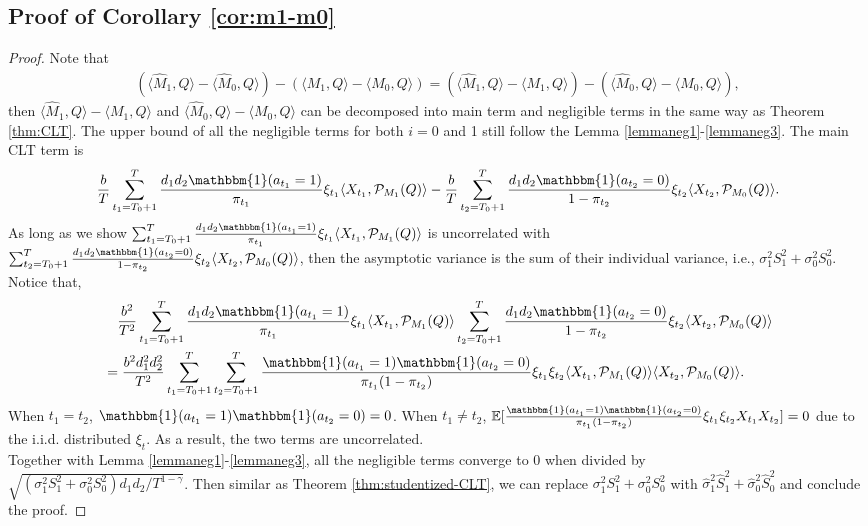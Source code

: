 \documentclass[12pt]{article}
\newcommand{\inp}[2]{\langle #1,#2\rangle}
\def\EE{{\mathbb E}}
\theoremstyle{plain}
\begin{document}
\subsection{Proof of Corollary \ref{cor:m1-m0}}
\begin{proof}
    Note that
    \begin{align*}
        (\inp{\widehat{M}_1}{Q} - \inp{\widehat{M}_0}{Q}) - (\inp{M_1}{Q} - \inp{M_0}{Q})= (\inp{\widehat{M}_1}{Q} - \inp{M_1}{Q}) - (\inp{\widehat{M}_0}{Q} - \inp{M_0}{Q}),
    \end{align*}
    then $\inp{\widehat{M}_1}{Q} - \inp{M_1}{Q}$ and $\inp{\widehat{M}_0}{Q} - \inp{M_0}{Q}$ can be decomposed into main term and negligible terms in the same way as Theorem \ref{thm:CLT}. The upper bound of all the negligible terms for both $i=0$ and 1 still follow the Lemma \ref{lemmaneg1}-\ref{lemmaneg3}. The main CLT term is
    \begin{align*}
        \frac{b}{T}\sum_{t_1=T_0+1}^{T}\frac{d_1d_2\mathbbm{1}(a_{t_1}=1)}{\pi_{t_1}}\xi_{t_1}\inp{X_{t_1}}{\mathcal{P}_{M_1}(Q)} - \frac{b}{T}\sum_{t_2=T_0+1}^{T}\frac{d_1d_2\mathbbm{1}(a_{t_2}=0)}{1-\pi_{t_2}}\xi_{t_2}\inp{X_{t_2}}{\mathcal{P}_{M_0}(Q)}.
    \end{align*}
    As long as we show $\sum_{t_1=T_0+1}^{T}\frac{d_1d_2\mathbbm{1}(a_{t_1}=1)}{\pi_{t_1}}\xi_{t_1}\inp{X_{t_1}}{\mathcal{P}_{M_1}(Q)}$ is uncorrelated with \\ $\sum_{t_2=T_0+1}^{T}\frac{d_1d_2\mathbbm{1}(a_{t_2}=0)}{1-\pi_{t_2}}\xi_{t_2}\inp{X_{t_2}}{\mathcal{P}_{M_0}(Q)}$, then the asymptotic variance is the sum of their individual variance, i.e., $\sigma_1^2S_1^2+\sigma_0^2S_0^2$. Notice that,
    \begin{align*}
        &\quad \frac{b^2}{T^2}\sum_{t_1=T_0+1}^{T}\frac{d_1d_2\mathbbm{1}(a_{t_1}=1)}{\pi_{t_1}}\xi_{t_1}\inp{X_{t_1}}{\mathcal{P}_{M_1}(Q)} \sum_{t_2=T_0+1}^{T}\frac{d_1d_2\mathbbm{1}(a_{t_2}=0)}{1-\pi_{t_2}}\xi_{t_2}\inp{X_{t_2}}{\mathcal{P}_{M_0}(Q)} \\
        &=\frac{b^2d_1^2d_2^2}{T^2}\sum_{t_1=T_0+1}^{T}\sum_{t_2=T_0+1}^{T} \frac{\mathbbm{1}(a_{t_1}=1)\mathbbm{1}(a_{t_2}=0)}{\pi_{t_1}(1-\pi_{t_2})}\xi_{t_1}\xi_{t_2}\inp{X_{t_1}}{\mathcal{P}_{M_1}(Q)}\inp{X_{t_2}}{\mathcal{P}_{M_0}(Q)}.
    \end{align*}
    When $t_1=t_2$, $\mathbbm{1}(a_{t_1}=1)\mathbbm{1}(a_{t_2}=0)=0$. When $t_1\neq t_2$, $\EE[\frac{\mathbbm{1}(a_{t_1}=1)\mathbbm{1}(a_{t_2}=0)}{\pi_{t_1}(1-\pi_{t_2})}\xi_{t_1}\xi_{t_2}X_{t_1}X_{t_2}]=0$ due to the i.i.d. distributed $\xi_t$. As a result, the two terms are uncorrelated. \\
    Together with Lemma \ref{lemmaneg1}-\ref{lemmaneg3}, all the negligible terms converge to 0 when divided by \\ $\sqrt{(\sigma_1^2S_1^2+\sigma_0^2S_0^2)d_1d_2/T^{1-\gamma}}$. Then similar as Theorem \ref{thm:studentized-CLT}, we can replace $\sigma_1^2S_1^2+\sigma_0^2S_0^2$ with $\widehat{\sigma}_1^2\widehat{S}_1^2+\widehat{\sigma}_0^2\widehat{S}_0^2$ and conclude the proof.
\end{proof}
\end{document}

